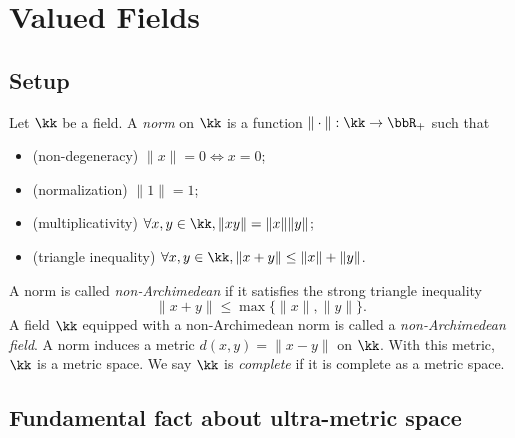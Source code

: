 \section{Valued Fields}

\subsection{Setup}

    Let \(\kk\) be a field.
    A \emph{norm} on \(\kk\) is a function \(\|\cdot\|: \kk \to \bbR_+\) such that
    \begin{itemize}
        \item (non-degeneracy) \(\|x\| = 0 \iff x = 0\);
        \item (normalization) \(\|1\| = 1\);
        \item (multiplicativity) \(\forall x,y \in \kk, \|xy\| = \|x\|\|y\|\);
        \item (triangle inequality) \(\forall x,y \in \kk, \|x + y\| \leq \|x\| + \|y\|\).
    \end{itemize}
    A norm is called \emph{non-Archimedean} if it satisfies the strong triangle inequality
    \[
        \|x + y\| \leq \max\{\|x\|, \|y\|\}.
    \]
    A field \(\kk\) equipped with a non-Archimedean norm is called a \emph{non-Archimedean field}.
    A norm induces a metric \(d(x,y) = \|x - y\|\) on \(\kk\).
    With this metric, \(\kk\) is a metric space.
    We say \(\kk\) is \emph{complete} if it is complete as a metric space.

\subsection{Fundamental fact about ultra-metric space}
